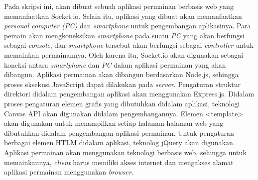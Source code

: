 Pada skripsi ini, akan dibuat sebuah aplikasi permainan berbasis web yang memanfaatkan Socket.io. Selain itu, aplikasi yang dibuat akan memanfaatkan \textit{personal computer (PC)} dan \textit{smartphone} untuk pengembangan aplikasinya. Para pemain akan mengkoneksikan \textit{smartphone} pada suatu \textit{PC} yang akan berfungsi sebagai \textit{console}, dan \textit{smartphone} tersebut akan berfungsi sebagai \textit{controller} untuk memainkan permainannya. Oleh karena itu, Socket.io akan digunakan sebagai koneksi antara \textit{smartphone} dan \textit{PC} dalam aplikasi permainan yang akan dibangun. Aplikasi permainan akan dibangun berdasarkan Node.js, sehingga proses eksekusi JavaScript dapat dilakukan pada \textit{server}. Pengaturan struktur direktori didalam pengembangan aplikasi akan menggunakan Express.js. Didalam proses pengaturan elemen grafis yang dibutuhkan didalam aplikasi, teknologi Canvas API akan digunakan didalam pengembangannya. Elemen <template> akan digunakan untuk menampilkan setiap halaman-halaman web yang dibutuhkan didalam pengembangan aplikasi permainan. Untuk pengaturan berbagai elemen HTLM didalam aplikasi, teknolog jQuery akan digunakan. Aplikasi permainan akan menggunakan teknologi berbasis web, sehingga untuk memainkannya, \textit{client} harus memiliki akses internet dan mengakses alamat aplikasi permainan menggunakan \textit{browser}.



